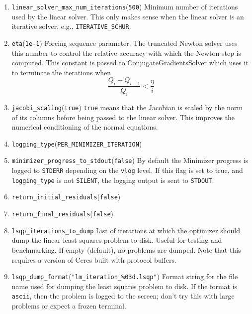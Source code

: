 \begin{enumerate}
\item{\texttt{linear\_solver\_max\_num\_iterations}}(\texttt{500}) Minimum number of iterations used by the linear solver. This only makes sense when the linear solver is an iterative solver, e.g., \texttt{ITERATIVE\_SCHUR}.

\item{\texttt{eta}}(\texttt{1e-1})
 Forcing sequence parameter. The truncated Newton solver uses
    this number to control the relative accuracy with which the
     Newton step is computed. This constant is passed to ConjugateGradientsSolver which uses
     it to terminate the iterations when
\begin{equation}    
      \frac{Q_i - Q_{i-1}}{Q_i} < \frac{\eta}{i}
\end{equation}

\item{\texttt{jacobi\_scaling}}(\texttt{true}) \texttt{true} means that the Jacobian is scaled by the norm of its columns before being passed to the linear solver. This improves the numerical conditioning of the normal equations.

\item{\texttt{logging\_type}}(\texttt{PER\_MINIMIZER\_ITERATION})


\item{\texttt{minimizer\_progress\_to\_stdout}}(\texttt{false})
By default the Minimizer progress is logged to \texttt{STDERR} depending on the \texttt{vlog} level. If this flag is
set to true, and \texttt{logging\_type} is not \texttt{SILENT}, the logging output
is sent to \texttt{STDOUT}.

\item{\texttt{return\_initial\_residuals}}(\texttt{false})
\item{\texttt{return\_final\_residuals}}(\texttt{false})


\item{\texttt{lsqp\_iterations\_to\_dump}}
 List of iterations at which the optimizer should dump the
     linear least squares problem to disk. Useful for testing and
     benchmarking. If empty (default), no problems are dumped.
Note that this requires a version of Ceres built with protocol buffers.

\item{\texttt{lsqp\_dump\_format}}(\texttt{"lm\_iteration\_\%03d.lsqp"})
 Format string for the file name used for dumping the least
     squares problem to disk. If the format is \texttt{ascii}, then the
     problem is logged to the screen; don't try this with large
     problems or expect a frozen terminal.


\end{enumerate}
